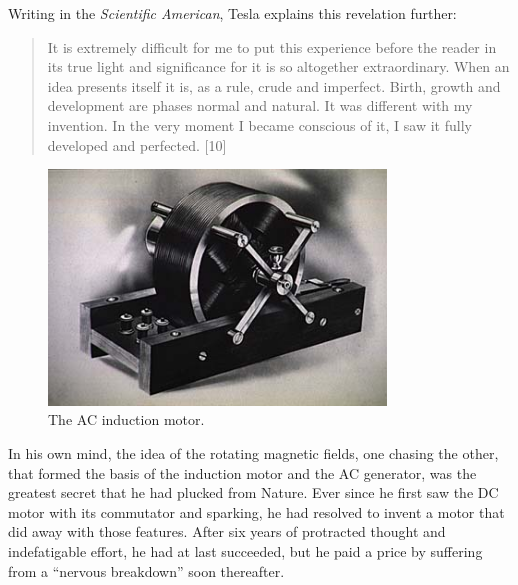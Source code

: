 \documentclass[
  12pt,
  british,
  a4paper,
]{article}
\begin{document}
Writing in the \emph{Scientific American}, Tesla explains this
revelation further:

\begin{quote}
It is extremely difficult for me to put this experience before the
reader in its true light and significance for it is so altogether
extraordinary. When an idea presents itself it is, as a rule, crude and
imperfect. Birth, growth and development are phases normal and natural.
It was different with my invention. In the very moment I became
conscious of it, I saw it fully developed and perfected. {[}10{]}
\end{quote}

\begin{figure}
\hypertarget{fig:ac-motor}{%
\centering
\includegraphics[width=0.8\textwidth,height=\textheight]{images/acmot_main02.jpg}
\caption[The AC induction motor.]{The AC induction
motor.\footnotemark{}}\label{fig:ac-motor}
}
\end{figure}

In his own mind, the idea of the rotating magnetic fields, one chasing
the other, that formed the basis of the induction motor and the AC
generator, was the greatest secret that he had plucked from Nature. Ever
since he first saw the DC motor with its commutator and sparking, he had
resolved to invent a motor that did away with those features. After six
years of protracted thought and indefatigable effort, he had at last
succeeded, but he paid a price by suffering from a ``nervous breakdown''
soon thereafter.
\end{document}

